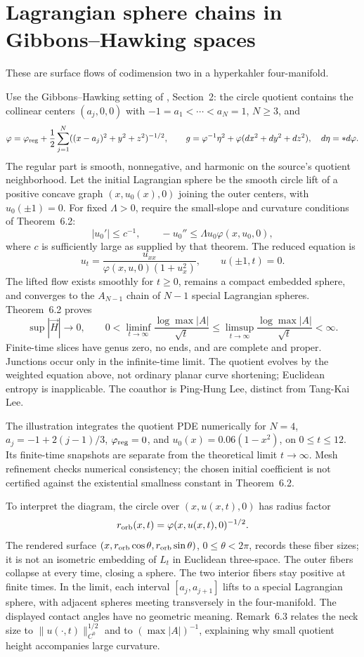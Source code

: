 \chapter{Lagrangian sphere chains in Gibbons--Hawking spaces}\label{sec:catalogue-lee-tsai}
These are surface flows of codimension two in a hyperkahler four-manifold.
\begin{example}\label{ex:catalogue-lee-tsai}
Use the Gibbons--Hawking setting of \cite{CatLeeTsai2026}, Section~2: the circle quotient contains the collinear centers $(a_j,0,0)$ with $-1=a_1<\cdots<a_N=1$, $N\geq3$, and
\[
 \varphi=\varphi_{\rm reg}+\frac12\sum_{j=1}^N
 ((x-a_j)^2+y^2+z^2)^{-1/2},\qquad
 g=\varphi^{-1}\eta^2+\varphi(dx^2+dy^2+dz^2),
 \quad d\eta=*d\varphi.
\]
The regular part is smooth, nonnegative, and harmonic on the source's quotient neighborhood. Let the initial Lagrangian sphere be the smooth circle lift of a positive concave graph $(x,u_0(x),0)$ joining the outer centers, with $u_0(\pm1)=0$. For fixed $\Lambda>0$, require the small-slope and curvature conditions of Theorem~6.2:
\[
 |u_0'|\leq c^{-1},\qquad -u_0''\leq\Lambda u_0\varphi(x,u_0,0),
\]
where $c$ is sufficiently large as supplied by that theorem. The reduced equation is
\[
 u_t=\frac{u_{xx}}{\varphi(x,u,0)(1+u_x^2)},\qquad u(\pm1,t)=0.
\]
The lifted flow exists smoothly for $t\geq0$, remains a compact embedded sphere, and converges to the $A_{N-1}$ chain of $N-1$ special Lagrangian spheres. Theorem~6.2 proves
\[
 \sup|\vec H|\longrightarrow0,\qquad
 0<\liminf_{t\to\infty}\frac{\log\max|A|}{\sqrt t}
 \leq\limsup_{t\to\infty}\frac{\log\max|A|}{\sqrt t}<\infty.
\]
Finite-time slices have genus zero, no ends, and are complete and proper. Junctions occur only in the infinite-time limit. The quotient evolves by the weighted equation above, not ordinary planar curve shortening; Euclidean entropy is inapplicable. The coauthor is Ping-Hung Lee, distinct from Tang-Kai Lee.

The illustration integrates the quotient PDE numerically for $N=4$, $a_j=-1+2(j-1)/3$, $\varphi_{\rm reg}=0$, and $u_0(x)=0.06(1-x^2)$, on $0\leq t\leq12$. Its finite-time snapshots are separate from the theoretical limit $t\to\infty$. Mesh refinement checks numerical consistency; the chosen initial coefficient is not certified against the existential smallness constant in Theorem~6.2.

To interpret the diagram, the circle over $(x,u(x,t),0)$ has radius factor
\[
 r_{\rm orb}(x,t)=\varphi(x,u(x,t),0)^{-1/2}.
\]
The rendered surface $(x,r_{\rm orb}\cos\theta,r_{\rm orb}\sin\theta)$, $0\leq\theta<2\pi$, records these fiber sizes; it is not an isometric embedding of $L_t$ in Euclidean three-space. The outer fibers collapse at every time, closing a sphere. The two interior fibers stay positive at finite times. In the limit, each interval $[a_j,a_{j+1}]$ lifts to a special Lagrangian sphere, with adjacent spheres meeting transversely in the four-manifold. The displayed contact angles have no geometric meaning. Remark~6.3 relates the neck size to $\|u(\cdot,t)\|_{C^0}^{1/2}$ and to $(\max|A|)^{-1}$, explaining why small quotient height accompanies large curvature.
\end{example}

